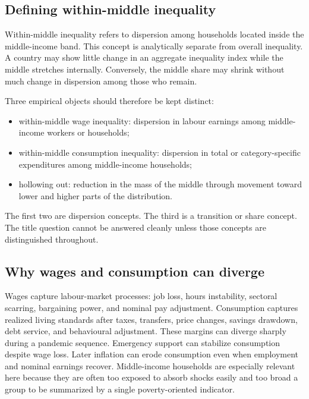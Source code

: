 \documentclass[11pt]{article}
\begin{document}
\subsection{Defining within-middle inequality}
Within-middle inequality refers to dispersion among households located inside the middle-income band. This concept is analytically separate from overall inequality. A country may show little change in an aggregate inequality index while the middle stretches internally. Conversely, the middle share may shrink without much change in dispersion among those who remain.

Three empirical objects should therefore be kept distinct:
\begin{itemize}
\item within-middle wage inequality: dispersion in labour earnings among middle-income workers or households;
\item within-middle consumption inequality: dispersion in total or category-specific expenditures among middle-income households;
\item hollowing out: reduction in the mass of the middle through movement toward lower and higher parts of the distribution.
\end{itemize}

The first two are dispersion concepts. The third is a transition or share concept. The title question cannot be answered cleanly unless those concepts are distinguished throughout.

\subsection{Why wages and consumption can diverge}
Wages capture labour-market processes: job loss, hours instability, sectoral scarring, bargaining power, and nominal pay adjustment. Consumption captures realized living standards after taxes, transfers, price changes, savings drawdown, debt service, and behavioural adjustment. These margins can diverge sharply during a pandemic sequence. Emergency support can stabilize consumption despite wage loss. Later inflation can erode consumption even when employment and nominal earnings recover. Middle-income households are especially relevant here because they are often too exposed to absorb shocks easily and too broad a group to be summarized by a single poverty-oriented indicator.
\end{document}
